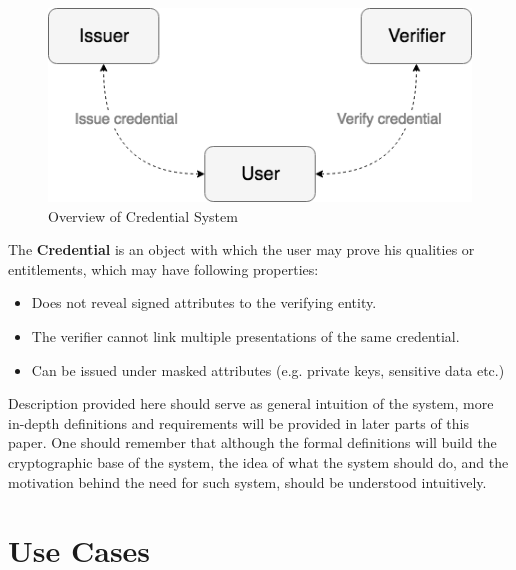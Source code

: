 \begin{figure}[h]
\centering
\includegraphics[scale=0.6]{images/CredentialSystemDiagram.png}
\caption{Overview of Credential System}
\label{fig: credential system overview}
\end{figure}

\noindent The \textbf{Credential} is an object with which the user may prove his qualities or entitlements, which may have following properties:
\begin{itemize}
    \item Does not reveal signed attributes to the verifying entity. 
    \item The verifier cannot link multiple presentations of the same credential.
    \item Can be issued under masked attributes (e.g. private keys, sensitive data etc.)
\end{itemize}

Description provided here should serve as general intuition of the system, more in-depth definitions and requirements will be provided in later parts of this paper. One should remember that although the formal definitions will build the cryptographic base of the system, the idea of what the system should do, and the motivation behind the need for such system, should be understood intuitively. 


\section{Use Cases}

